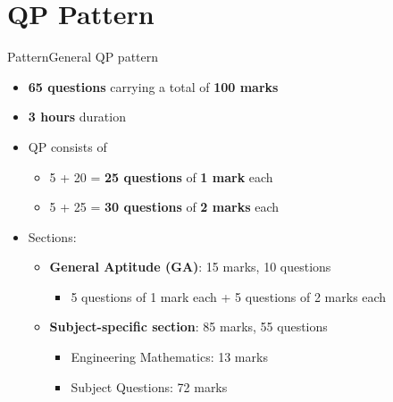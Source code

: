 \documentclass[handout]{beamer}
\begin{document}
\section{QP Pattern}
\begin{frame}{Pattern}{General QP pattern}
    \begin{itemize}
        \item \textbf{65 questions} carrying a total of \textbf{100 marks}
        \item \textbf{3 hours} duration
        \item QP consists of
              \begin{itemize}
                  \item 5 + 20 = \textbf{25 questions} of \textbf{1 mark} each
                  \item 5 + 25 = \textbf{30 questions} of \textbf{2 marks} each
              \end{itemize}
        \item Sections:
              \begin{itemize}
                  \item \textbf{General Aptitude (GA)}: 15 marks, 10 questions
                        \begin{itemize}
                            \item 5 questions of 1 mark each + 5 questions of 2 marks each
                        \end{itemize}
                  \item \textbf{Subject-specific section}: 85 marks, 55 questions
                        \begin{itemize}
                            \item Engineering Mathematics: 13 marks
                            \item Subject Questions: 72 marks
                        \end{itemize}
              \end{itemize}
    \end{itemize}
\end{frame}
\end{document}
